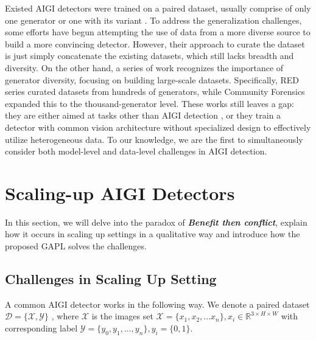     Existed AIGI detectors were trained on a paired dataset, usually comprise of only one generator or one with its variant \cite{wang2020cnn,chen2024drct, Guillaro2024biasfree,chen2025dda}. To address the generalization challenges, some efforts have begun attempting the use of data from a more diverse source \cite{yang2025d3, yan2024sanity, wen2025spot} to build a more convincing detector. However, their approach to curate the dataset is just simply concatenate the existing datasets, which still lacks breadth and diversity. On the other hand, a series of work recognizes the importance of generator diversity, focusing on building large-scale datasets. Specifically, RED series \cite{red116, red140} curated datasets from hundreds of generators, while Community Forensics \cite{park2025commfor} expanded this to the thousand-generator level. These works still leaves a gap: they are either aimed at tasks other than AIGI detection \cite{red116, red140}, or they train a detector \cite{park2025commfor} with common vision architecture without specialized design to effectively utilize heterogeneous data. To our knowledge, we are the first to simultaneously consider both model-level and data-level challenges in AIGI detection. 
   
\section{Scaling-up AIGI Detectors}

    In this section, we will delve into the paradox of \textbf{\textit{Benefit then conflict}}, explain how it occurs in scaling up settings in a qualitative way and introduce how the proposed GAPL solves the challenges. 
    
\subsection{Challenges in Scaling Up Setting}  
    \label{}
    A common AIGI detector works in the following way. We denote a paired dataset $\mathcal{D}=\{\mathcal{X}, \mathcal{Y}\}$ , where $\mathcal{X}$ is the images set $\mathcal{X}=\{ x_{1}, x_2, ...x_n\}, x_i \in \mathbb{R}^{3 \times H \times W} $ with corresponding label $\mathcal{Y}=\{y_0, y_1, ..., y_n \}, y_i=\{ 0,1 \}$.
    
